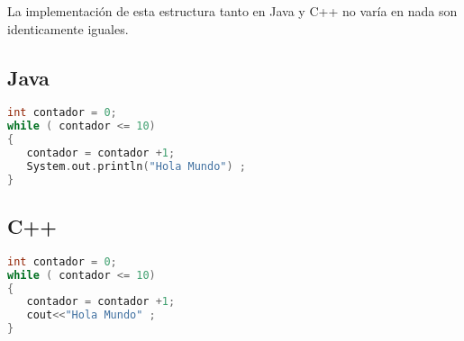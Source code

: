 La implementación de esta estructura tanto en Java y C++ no varía en nada son identicamente iguales. 

\subsection{Java}
\begin{lstlisting}[language=C++]
int contador = 0;
while ( contador <= 10)
{
   contador = contador +1;
   System.out.println("Hola Mundo") ;
}
\end{lstlisting}


\subsection{C++}
\begin{lstlisting}[language=C++]
int contador = 0;
while ( contador <= 10)
{
   contador = contador +1;
   cout<<"Hola Mundo" ;
}
\end{lstlisting}